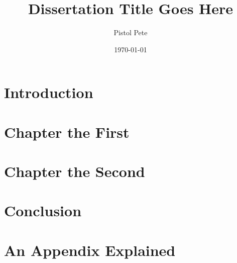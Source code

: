\documentclass[12pt]{okstate}
\date{\today}
\title{Dissertation Title Goes Here}
\author{Pistol Pete}
\begin{document}
 
	
	
	
	\chapter{Introduction}
	\label{chap:1}
	
	
	\chapter{Chapter the First}
	\label{chap:2}
	
	
	\chapter{Chapter the Second}
	\label{chap:3}
	
	
	
	\chapter{Conclusion}
	\label{chap:c}
	

	
	
	
	\appendix
	\chapter{An Appendix Explained}
	\label{appendix:1}
	
	

	
	
	
	
	
	
	
	
	
	
\end{document}
